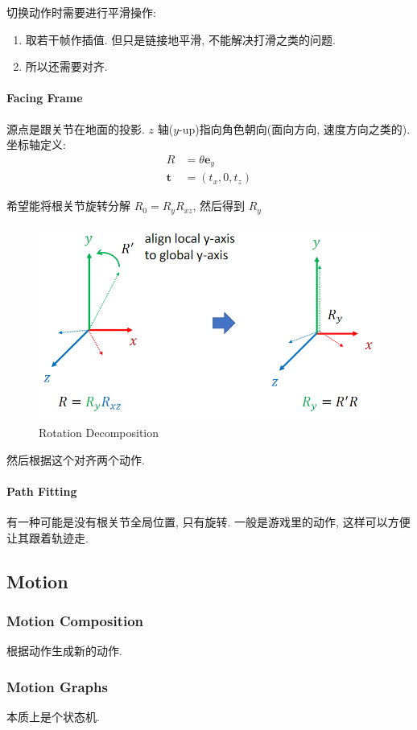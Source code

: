 切换动作时需要进行平滑操作:
\begin{enumerate}
    \item  取若干帧作插值. 但只是链接地平滑, 不能解决打滑之类的问题. 
    \item 所以还需要对齐. 
\end{enumerate}

\paragraph{Facing Frame} 源点是跟关节在地面的投影. $z$ 轴($y$-up)指向角色朝向(面向方向, 速度方向之类的). 坐标轴定义: 
\begin{align*}
    R &= \theta \bm e_y\\
    \bm t&= (t_x, 0, t_z)
\end{align*}

希望能将根关节旋转分解 $R_0=R_yR_{xz}$, 然后得到 $R_y$

\begin{figure}[!htb]
    \centering
    \includegraphics[width=0.618\linewidth]{pic/1055/Rotation Decomposition}
    \caption{Rotation Decomposition}
\end{figure}

然后根据这个对齐两个动作. 

\paragraph{Path Fitting} 有一种可能是没有根关节全局位置, 只有旋转. 一般是游戏里的动作, 这样可以方便让其跟着轨迹走. 

\subsection{Motion}
\subsubsection{Motion Composition}
根据动作生成新的动作. 

\subsubsection{Motion Graphs}
本质上是个状态机. 

